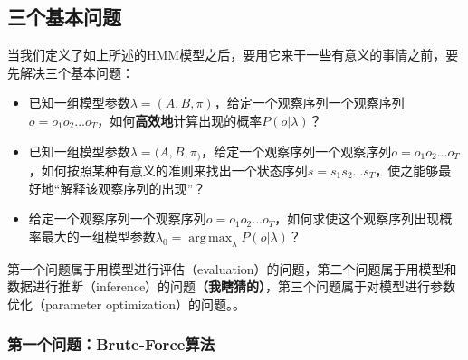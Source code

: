 \documentclass[11pt,a4paper]{article}
\DeclareMathOperator*{\argmax}{arg\,max}
\begin{document}
\subsection{三个基本问题}

当我们定义了如上所述的HMM模型之后，要用它来干一些有意义的事情之前，要先解决三个基本问题：
\begin{itemize}
\item 已知一组模型参数$\lambda = (A, B, \pi)$，给定一个观察序列一个观察序列$o=o_1 o_2 ... o_T$，如何\textbf{高效地}计算出现的概率$P(o | \lambda)$？
\item 已知一组模型参数$\lambda = (A, B, \pi_)$，给定一个观察序列一个观察序列$o=o_1 o_2 ... o_T$，如何按照某种有意义的准则来找出一个状态序列$s = s_1 s_2 ... s_T$，使之能够最好地“解释该观察序列的出现”？
\item 给定一个观察序列一个观察序列$o=o_1 o_2 ... o_T$，如何求使这个观察序列出现概率最大的一组模型参数$\lambda_0 = \argmax_{\lambda} P(o | \lambda) $？
\end{itemize}
第一个问题属于用模型进行评估（evaluation）的问题，第二个问题属于用模型和数据进行推断（inference）的问题\textbf{（我瞎猜的）}，第三个问题属于对模型进行参数优化（parameter optimization）的问题。。

\subsubsection{第一个问题：Brute-Force算法}
\end{document}

